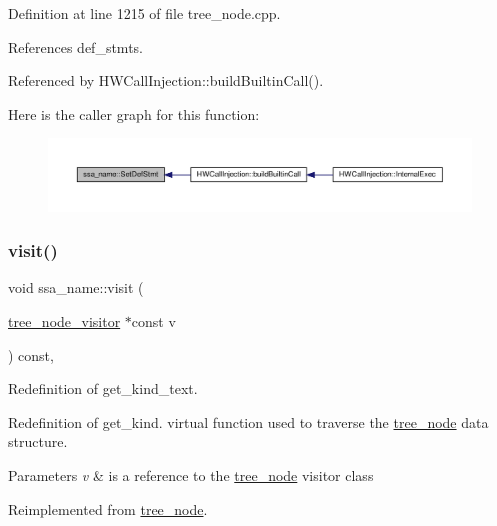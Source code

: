 Definition at line 1215 of file tree\+\_\+node.\+cpp.



References def\+\_\+stmts.



Referenced by H\+W\+Call\+Injection\+::build\+Builtin\+Call().

Here is the caller graph for this function\+:
\nopagebreak
\begin{figure}[H]
\begin{center}
\leavevmode
\includegraphics[width=350pt]{db/d2f/structssa__name_a62b25db42763bfdd380ff6a87a02c7ad_icgraph}
\end{center}
\end{figure}
\mbox{\label{structssa__name_a9dd9ab89f7b91f1698c66869146a89dd}} 
\subsubsection{\texorpdfstring{visit()}{visit()}}
{\footnotesize\ttfamily void ssa\+\_\+name\+::visit (\begin{DoxyParamCaption}\item[{\hyperlink{classtree__node__visitor}{tree\+\_\+node\+\_\+visitor} $\ast$const}]{v }\end{DoxyParamCaption}) const\hspace{0.3cm}{\ttfamily [override]}, {\ttfamily [virtual]}}



Redefinition of get\+\_\+kind\+\_\+text. 

Redefinition of get\+\_\+kind. virtual function used to traverse the \hyperlink{classtree__node}{tree\+\_\+node} data structure. 
\begin{DoxyParams}{Parameters}
{\em v} & is a reference to the \hyperlink{classtree__node}{tree\+\_\+node} visitor class \\
\hline
\end{DoxyParams}


Reimplemented from \hyperlink{classtree__node_aa9abba3f1b30e0be80b4a56b188c6ecc}{tree\+\_\+node}.



